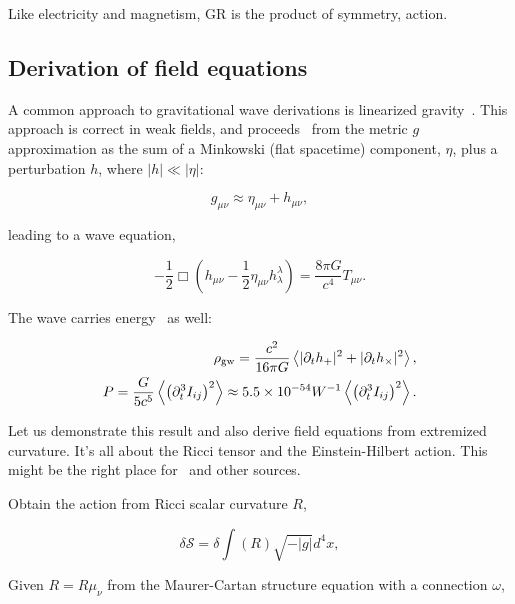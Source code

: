            Like electricity and magnetism, GR is the product of symmetry, action. 


        \subsection{Derivation of field equations}
        \label{field_equations}

            A common approach to gravitational wave derivations is linearized gravity~\cite{FlanaganHughes2005}.
            This approach is correct in weak fields, and proceeds~\cite{AdhikariThesis} from the metric $g$ approximation as the sum of a Minkowski (flat spacetime) component, $\eta$, plus a perturbation $h$, where $|h| \ll |\eta|$:

\begin{equation}
g_{\mu \nu} \approx \eta_{\mu \nu} + h_{\mu \nu},
\end{equation}

\noindent leading to a wave equation,

\begin{equation}
-\frac{1}{2} \Box \left(h_{\mu \nu} - \frac{1}{2} \eta_{\mu \nu} h_{\lambda}^{\lambda} \right) = \frac{8 \pi G}{c^4} T_{\mu \nu}.
\end{equation}

The wave carries energy~\cite{BallmerThesis} as well:

\begin{eqnarray}
\rho_{\textup{gw}} = \frac{c^2}{16 \pi G} \left\langle |\partial_t h_+|^2 + |\partial_t h_\times|^2 \right\rangle,\\
P = \frac{G}{5c^5}\left\langle \left( \partial_t^3 I_{ij}\right)^2  \right\rangle \approx 5.5\times 10^{-54} W^{-1} \left\langle \left( \partial_t^3 I_{ij}\right)^2  \right\rangle.
\end{eqnarray}

Let us demonstrate this result and also derive field equations from extremized curvature.
		It's all about the Ricci tensor and the Einstein-Hilbert action. This might be the right place for~\cite{FarrThesis} and other sources.



Obtain the action from Ricci scalar curvature $R$,

\begin{equation}
\delta \mathcal{S} = \delta \int \left( R \right) \sqrt{-|g|}d^4 x,
\end{equation}

Given $R = R\mu_\nu$ from the Maurer-Cartan structure equation with a connection $\omega$,

